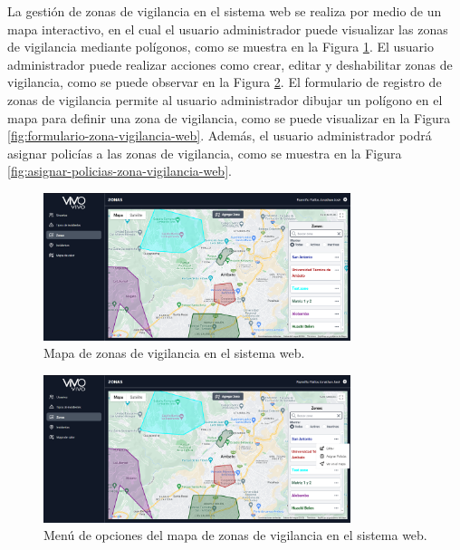 La gestión de zonas de vigilancia en el sistema web se realiza por medio de un mapa interactivo, en el cual el usuario administrador
puede visualizar las zonas de vigilancia mediante polígonos, como se muestra en la Figura \ref{fig:mapa-zonas-vigilancia-web}.
El usuario administrador puede realizar acciones como crear, editar y deshabilitar zonas de vigilancia, como se puede observar en la Figura
\ref{fig:menu-mapa-zonas-vigilancia-web}. El formulario de registro de zonas de vigilancia permite al usuario administrador dibujar
un polígono en el mapa para definir una zona de vigilancia, como se puede visualizar en la Figura \ref{fig:formulario-zona-vigilancia-web}.
Además, el usuario administrador podrá asignar policías a las zonas de vigilancia, como se muestra en la Figura
\ref{fig:asignar-policias-zona-vigilancia-web}.

\begin{figure}[H]
    \centering
    \includegraphics[width=0.8\textwidth]{chapters/III-resultados-y-discusion/resources/images/mapa-zonas-vigilancia-web.png}
    \caption{Mapa de zonas de vigilancia en el sistema web.}
    \label{fig:mapa-zonas-vigilancia-web}
\end{figure}

\begin{figure}[H]
    \centering
    \includegraphics[width=0.8\textwidth]{chapters/III-resultados-y-discusion/resources/images/menu-mapa-zonas-vigilancia-web.png}
    \caption{Menú de opciones del mapa de zonas de vigilancia en el sistema web.}
    \label{fig:menu-mapa-zonas-vigilancia-web}
\end{figure}

